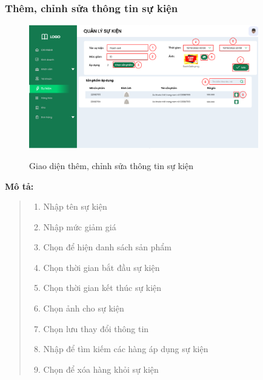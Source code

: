         \subsubsection{Thêm, chỉnh sửa thông tin sự kiện}
            \begin{figure}[!htp]
                \centering
                \includegraphics[width=10cm]{img/UI/admin/Event_detail.png}
                \label{35}
                \newline
                \caption{Giao diện thêm, chỉnh sửa thông tin sự kiện}
            \end{figure}
            \textbf{Mô tả:}  
            \begin{quote}
                \begin{enumerate}
                    \item Nhập tên sự kiện
                    \item Nhập mức giảm giá
                    \item Chọn để hiện danh sách sản phẩm
                    \item Chọn thời gian bắt đầu sự kiện
                    \item Chọn thời gian kết thúc sự kiện
                    \item Chọn ảnh cho sự kiện
                    \item Chọn lưu thay đổi thông tin
                    \item Nhập để tìm kiếm các hàng áp dụng sự kiện
                    \item Chọn để xóa hàng khỏi sự kiện
                \end{enumerate}
            \end{quote}
        
